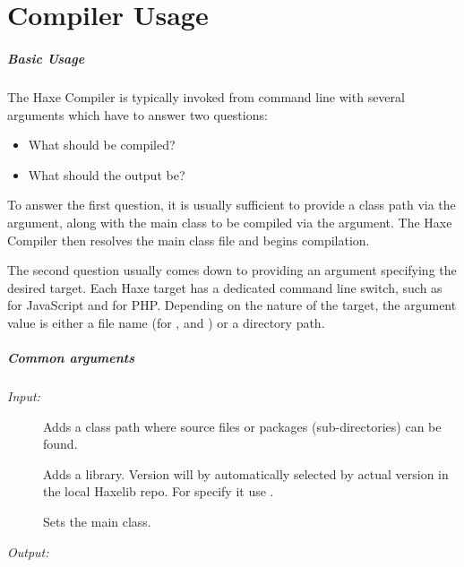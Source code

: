 \chapter{Compiler Usage}
\label{compiler-usage}

\paragraph{Basic Usage}

The Haxe Compiler is typically invoked from command line with several arguments which have to answer two questions:

\begin{itemize}
	\item What should be compiled?
	\item What should the output be?
\end{itemize}
	
To answer the first question, it is usually sufficient to provide a class path via the  argument, along with the main class to be compiled via the  argument. The Haxe Compiler then resolves the main class file and begins compilation.

The second question usually comes down to providing an argument specifying the desired target. Each Haxe target has a dedicated command line switch, such as  for JavaScript and  for PHP. Depending on the nature of the target, the argument value is either a file name (for ,  and ) or a directory path.

\paragraph{Common arguments}

\emph{Input:}

\begin{description}
	\item[] Adds a class path where  source files or packages (sub-directories) can be found.
	\item[] Adds a  library. Version will by automatically selected by actual version in the local Haxelib repo. For specify it use .
	\item[] Sets the main class.
\end{description}

\emph{Output:}

